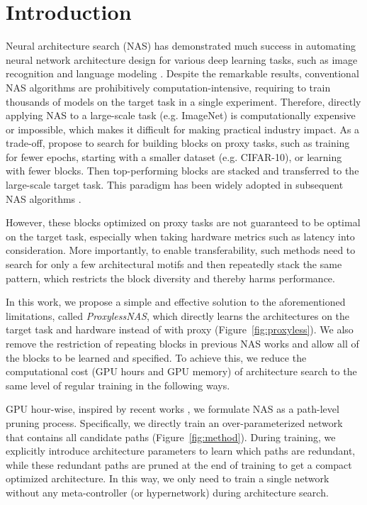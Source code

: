 \documentclass{article} \usepackage{iclr2019_conference,times}
\begin{document}
\section{Introduction}
Neural architecture search (NAS) has demonstrated much success in automating neural network architecture design for various deep learning tasks, such as image recognition
\citep{zoph2017learning,cai2018efficient,liu2017progressive,zhong2018practical} and language modeling \citep{zoph2016neural}.
Despite the remarkable results, conventional NAS algorithms are prohibitively computation-intensive, requiring to train thousands of models on the target task in a single experiment. Therefore, directly applying NAS to a large-scale task (e.g. ImageNet) is computationally expensive or impossible, which makes it difficult for making practical industry impact. 
As a trade-off, \citet{zoph2017learning} propose to search for building blocks on proxy tasks, such as training for fewer epochs, starting with a smaller dataset (e.g. CIFAR-10), or learning with fewer blocks. Then top-performing blocks are stacked and transferred to the large-scale target task. This paradigm has been widely adopted in subsequent NAS algorithms \citep{liu2017progressive,liu2017hierarchical,real2018regularized,cai2018path,liu2018darts,tan2018mnasnet,luo2018neural}. 

However, these blocks optimized on proxy tasks are not guaranteed to be optimal on the target task, especially when taking hardware metrics such as latency into consideration. 
More importantly, to enable transferability, such methods need to search for only a few architectural motifs and then repeatedly stack the same pattern, which restricts the block diversity and thereby harms performance. 

In this work, we propose a simple and effective solution to the aforementioned limitations, called \emph{ProxylessNAS}, which directly learns the architectures on the target task and hardware instead of with proxy (Figure~\ref{fig:proxyless}). We also remove the restriction of repeating blocks in previous NAS works \citep{zoph2017learning,liu2018darts} and allow all of the blocks to be learned and specified. 
To achieve this, we reduce the computational cost (GPU hours and GPU memory) of architecture search to the same level of regular training in the following ways.

GPU hour-wise, inspired by recent works \citep{liu2018darts,bender2018understanding}, we formulate NAS as a path-level pruning process. Specifically, we directly train an over-parameterized network that contains all candidate paths (Figure~\ref{fig:method}). During training, we explicitly introduce architecture parameters to learn which paths are redundant, while these redundant paths are pruned at the end of training to get a compact optimized architecture. In this way, we only need to train a single network without any meta-controller (or hypernetwork) during architecture search.
\end{document}
